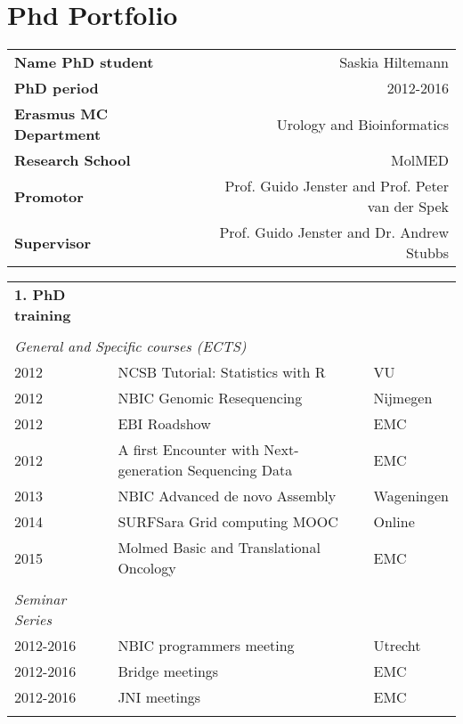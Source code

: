 \chapter{Phd Portfolio}
\label{AppendixE}

\tiny
\newpage
\begin{table}
    \begin{tabular}{lp{4cm}r}
        \textbf{Name PhD student}      && Saskia Hiltemann \\
        \textbf{PhD period}            && 2012-2016 \\
        \textbf{Erasmus MC Department} && Urology and Bioinformatics \\
        \textbf{Research School}       && MolMED \\
        \textbf{Promotor}              && Prof. Guido Jenster and Prof. Peter van der Spek \\
        \textbf{Supervisor}            && Prof. Guido Jenster and Dr. Andrew Stubbs \\
    \end{tabular}
\end{table}

\vspace{-5cm}
\small

\begin{table}
    \begin{tabular}{lll}
        \textbf{1. PhD training} \\
        \\
        \multicolumn{3}{l}{\textit{General  and Specific courses (ECTS)}} \\
        2012 & NCSB Tutorial: Statistics with R                       & VU \\
        2012 & NBIC Genomic Resequencing                              & Nijmegen \\
        2012 & EBI Roadshow                                           & EMC \\
        2012 & A first Encounter with Next-generation Sequencing Data & EMC \\
        2013 & NBIC Advanced de novo Assembly                         & Wageningen \\
        2014 & SURFSara Grid computing MOOC                           & Online \\
        2015 & Molmed Basic and Translational Oncology                & EMC \\
        \\
        \textit{Seminar Series} \\
        2012-2016 & NBIC programmers meeting       & Utrecht \\
        2012-2016 & Bridge meetings                & EMC \\
        2012-2016 & JNI meetings                   & EMC \\
        \\
    \end{tabular}
\end{table}

